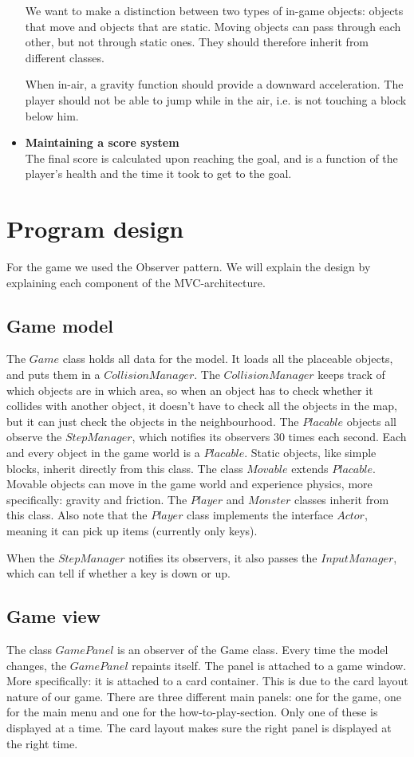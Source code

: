 \documentclass[a4paper,10pt,twoside]{article}
\begin{document}
\begin{itemize}
We want to make a distinction between two types of in-game objects: objects that move and objects that are static. Moving objects can pass through each other, but not through static ones. They should therefore inherit from different classes. 

When in-air, a gravity function should provide a downward acceleration. The player should not be able to jump while in the air, i.e. is not touching a block below him.
\item \textbf{Maintaining a score system}\\
The final score is calculated upon reaching the goal, and is a function of the player's health and the time it took to get to the goal. 

\end{itemize}

\section{Program design}
For the game we used the Observer pattern. We will explain the design by explaining each component of the MVC-architecture.
\subsection{Game model}
The $Game$ class holds all data for the model. It loads all the placeable objects, and puts them in a $CollisionManager$.
The $CollisionManager$ keeps track of which objects are in which area, so when an object has to check whether it collides with another object, it doesn't have to check all the objects in the map, but it can just check the objects in the neighbourhood.
The $Placable$ objects all observe the $StepManager$, which notifies its observers 30 times each second. Each and every object in the game world is a $Placable$. Static objects, like simple blocks, inherit directly from this class. The class $Movable$ extends $Placable$. Movable objects can move in the game world and experience physics, more specifically: gravity and friction.  The $Player$ and $Monster$ classes inherit from this class. Also note that the $Player$ class implements the interface $Actor$, meaning it can pick up items (currently only keys).

When the $StepManager$ notifies its observers, it also passes the $InputManager$, which can tell if whether a key is down or up.

\subsection{Game view}
The class $GamePanel$ is an observer of the Game class. Every time the model changes, the $GamePanel$ repaints itself. The panel is attached to a game window. More specifically: it is attached to a card container. This is due to the card layout nature of our game. There are three different main panels: one for the game, one for the main menu and one for the how-to-play-section. Only one of these is displayed at a time. The card layout makes sure the right panel is displayed at the right time. 
\end{document}
